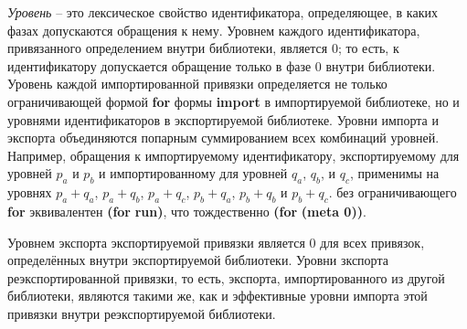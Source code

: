 %
\emph{Уровень} -- это лексическое свойство идентификатора, определяющее, в каких фазах допускаются
обращения к нему. Уровнем каждого идентификатора, привязанного определением внутри
библиотеки, является $0$; то есть, к идентификатору допускается обращение только в фазе $0$ внутри
библиотеки. Уровень каждой импортированной привязки определяется не только ограничивающей формой
{\cf\bfseries for} формы {\cf\bfseries import} в импортируемой библиотеке, но и уровнями
идентификаторов в экспортируемой библиотеке. Уровни импорта и экспорта объединяются попарным
суммированием всех комбинаций уровней. Например, обращения к импортируемому идентификатору,
экспортируемому для уровней $p_a$ и $p_b$ и импортированному для уровней $q_a$, $q_b$, и $q_c$,
применимы на уровнях $p_a+q_a$, $p_a+q_b$, $p_a+q_c$, $p_b+q_a$, $p_b+q_b$ и
$p_b+q_c$.  без ограничивающего {\cf\bfseries for} эквивалентен {\cf \textbf{(for}
   \textbf{run)}}, что тождественно {\cf \textbf{(for}
   \bfseries(meta 0))}.

Уровнем экспорта экспортируемой привязки является $0$ для всех привязок, определённых внутри
экспортируемой библиотеки. Уровни зкспорта реэкспортированной привязки, то есть, экспорта,
импортированного из другой библиотеки, являются такими же, как и эффективные уровни импорта этой
привязки внутри реэкспортируемой библиотеки.

